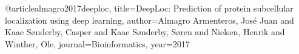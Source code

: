 @article{almagro2017deeploc,
  title={DeepLoc: Prediction of protein subcellular localization using deep learning},
  author={Almagro Armenteros, Jos{\'e} Juan and Kaae S{\o}nderby, Casper and Kaae S{\o}nderby, S{\o}ren and Nielsen, Henrik and Winther, Ole},
  journal={Bioinformatics},
  year={2017}
}
